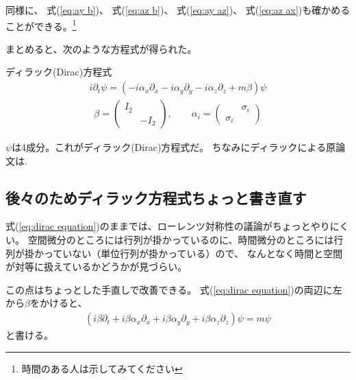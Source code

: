 \documentclass[10pt,a4paper]{jarticle}
\begin{document}
同様に、
式(\ref{eq:ay b})、
式(\ref{eq:az b})、
式(\ref{eq:ay az})、
式(\ref{eq:az ax})も確かめることができる。\footnote{時間のある人は示してみてください}

まとめると、次のような方程式が得られた。
\begin{itembox}[l]{ディラック(Dirac)方程式}
\begin{align}
i \partial_t \psi = (-i\alpha_x \partial_x-i\alpha_y \partial_y-i\alpha_z \partial_z + m \beta)\psi \label{eq:dirac equation}
\end{align}
%
\begin{align}
\beta = \left(\begin{array}{cc}
I_2 & \\
& -I_2
\end{array}\right), \qquad
\alpha_i = \left(\begin{array}{cc}
& \sigma_i \\
\sigma_i & 
\end{array}\right) \label{eq:alpha beta matrix}
\end{align}
\end{itembox}
$\psi$は4成分。これがディラック(Dirac)方程式だ。
ちなみにディラックによる原論文は\cite{Dirac:1928hu}.


\subsection{後々のためディラック方程式ちょっと書き直す}
式(\ref{eq:dirac equation})のままでは、ローレンツ対称性の議論がちょっとやりにくい。
空間微分のところには行列が掛かっているのに、時間微分のところには行列が掛かっていない（単位行列が掛かっている）ので、
なんとなく時間と空間が対等に扱えているかどうかが見づらい。

この点はちょっとした手直しで改善できる。
式(\ref{eq:dirac equation})の両辺に左から$\beta$をかけると、
\begin{align}
(i\beta\partial_t + i \beta\alpha_x \partial_x + i \beta\alpha_y \partial_y + i \beta\alpha_z \partial_z) \psi = m \psi \label{eq:dirac equation2}
\end{align}
と書ける。
\end{document}
